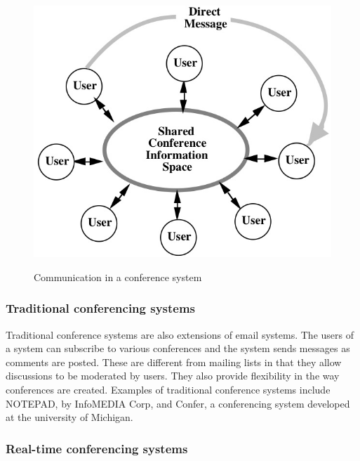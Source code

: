 \begin{figure}[htp]
  \centering
  \includegraphics[scale=.5]{ConfSys}
  \label{CONF_SYS}
  \caption{Communication in a conference system\cite{journals/iwc/Rodden91}}
\end{figure}


\subsubsection{Traditional conferencing systems}
Traditional conference systems are also extensions of email
systems. The users of a system can subscribe to various conferences
and the system sends messages as comments are posted.  These are
different from mailing lists in that they allow discussions to be
moderated by users.  They also provide flexibility in the way
conferences are created.  Examples of traditional conference systems
include NOTEPAD, by InfoMEDIA Corp, and Confer, a conferencing system
developed at the university of Michigan.

\subsubsection{Real-time conferencing systems}

